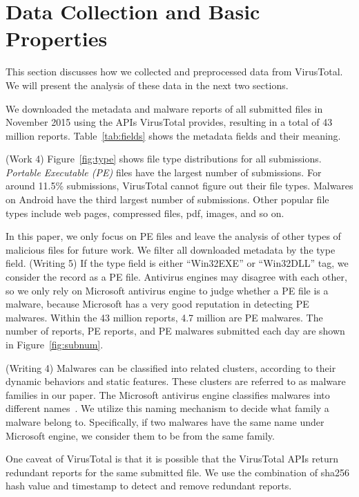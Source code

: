 
\section{Data Collection and Basic Properties}
\label{sec:meth}

This section discusses how we collected and preprocessed data from VirusTotal.
We will present the analysis of these data in the next two sections.



We downloaded the metadata and malware reports of all submitted files in November 2015 using the APIs VirusTotal provides,
resulting in a total of 43 million reports.
Table~\ref{tab:fields} shows the metadata fields and their meaning. 

{\color{red} (Work 4)
Figure~\ref{fig:type} shows file type distributions for all submissions. 
{\em Portable Executable (PE)}  files have the largest number of submissions. 
For around 11.5\% submissions, VirusTotal cannot figure out their file types. 
Malwares on Android have the third largest number of submissions.  
Other popular file types include web pages, compressed files, pdf, images, and so on. 
}

In this paper, we only focus on PE files 
and leave the analysis of other types of malicious files for future work. 
We filter all downloaded metadata by the type field. 
{\color{red} (Writing 5)
If the type field is either ``Win32EXE'' or ``Win32DLL'' tag, we consider the record as a PE file. 
Antivirus engines may disagree with each other, so
we only rely on Microsoft antivirus engine to judge whether a PE file is a malware, because
Microsoft has a very good reputation in detecting PE malwares. 
}
Within the 43 million reports, 4.7 million are PE malwares. 
The number of reports, PE reports, and PE malwares submitted each day are shown in Figure~\ref{fig:subnum}.

{\color{red} (Writing 4)
Malwares can be classified into related clusters, according to their dynamic behaviors and static features. 
These clusters are referred to as malware families in our paper. }
The Microsoft antivirus engine classifies malwares into different names~\cite{microsoft}. 
We utilize this naming mechanism to decide what family a malware belong to.
Specifically, if two malwares have the same name under Microsoft engine, we consider them to be from the same family.

One caveat of VirusTotal is that it is possible that the VirusTotal APIs return redundant reports 
for the same submitted file. 
We use the combination of sha256 hash value and timestamp to detect and remove redundant reports.

